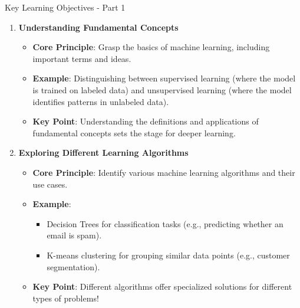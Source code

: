 \documentclass[aspectratio=169]{beamer}
\begin{document}
\begin{frame}[fragile]{Key Learning Objectives - Part 1}
    \begin{enumerate}
        \item \textbf{Understanding Fundamental Concepts}
        \begin{itemize}
            \item \textbf{Core Principle}: Grasp the basics of machine learning, including important terms and ideas.
            \item \textbf{Example}: Distinguishing between supervised learning (where the model is trained on labeled data) and unsupervised learning (where the model identifies patterns in unlabeled data).
            \item \textbf{Key Point}: Understanding the definitions and applications of fundamental concepts sets the stage for deeper learning.
        \end{itemize}
        
        \item \textbf{Exploring Different Learning Algorithms}
        \begin{itemize}
            \item \textbf{Core Principle}: Identify various machine learning algorithms and their use cases.
            \item \textbf{Example}: 
            \begin{itemize}
                \item Decision Trees for classification tasks (e.g., predicting whether an email is spam).
                \item K-means clustering for grouping similar data points (e.g., customer segmentation).
            \end{itemize}
            \item \textbf{Key Point}: Different algorithms offer specialized solutions for different types of problems!
        \end{itemize}
    \end{enumerate}
\end{frame}
\end{document}

